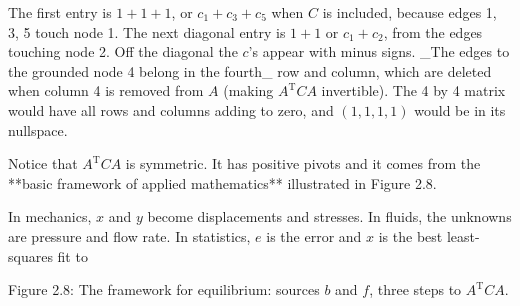 The first entry is \(1+1+1\), or \(c_{1}+c_{3}+c_{5}\) when \(C\) is included, because edges 1, 3, 5 touch node 1. The next diagonal entry is \(1+1\) or \(c_{1}+c_{2}\), from the edges touching node 2. Off the diagonal the \(c\)'s appear with minus signs. _The edges to the grounded node 4 belong in the fourth_ row and column, which are deleted when column 4 is removed from \(A\) (making \(A^{\mathrm{T}}CA\) invertible). The 4 by 4 matrix would have all rows and columns adding to zero, and \((1,1,1,1)\) would be in its nullspace.

Notice that \(A^{\mathrm{T}}CA\) is symmetric. It has positive pivots and it comes from the **basic framework of applied mathematics** illustrated in Figure 2.8.

In mechanics, \(x\) and \(y\) become displacements and stresses. In fluids, the unknowns are pressure and flow rate. In statistics, \(e\) is the error and \(x\) is the best least-squares fit to

Figure 2.8: The framework for equilibrium: sources \(b\) and \(f\), three steps to \(A^{\mathrm{T}}CA\).

 